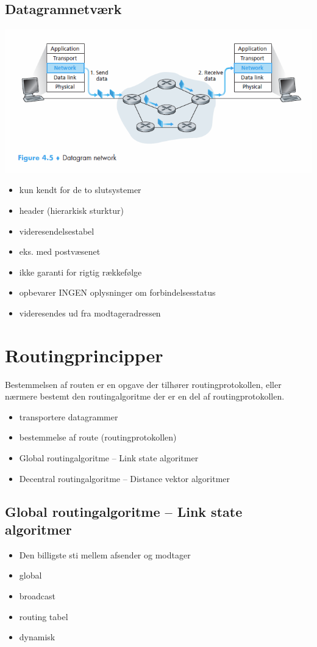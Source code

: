 {{\subsection{Datagramnetværk}
{\includegraphics{4-network-layer/datagramnetwork.png}
\begin{itemize}
	\item kun kendt for de to slutsystemer
	\item header (hierarkisk sturktur) 
	\item videresendelsestabel
	\item eks. med postvæsenet
	\item ikke garanti for rigtig rækkefølge
	\item opbevarer INGEN oplysninger om forbindelsesstatus
	\item videresendes ud fra modtageradressen
\end{itemize}

\section{Routingprincipper}
Bestemmelsen af routen er en opgave der tilhører routingprotokollen, eller nærmere bestemt den routingalgoritme der er en del af routingprotokollen.
\begin{itemize}
	\item transportere datagrammer
	\item bestemmelse af route (routingprotokollen)
	\item Global routingalgoritme – Link state algoritmer
	\item Decentral routingalgoritme – Distance vektor algoritmer
\end{itemize}

\subsection{Global routingalgoritme – Link state algoritmer}
\begin{itemize}
	\item Den billigste sti mellem afsender og modtager
	\item global
	\item broadcast
	\item routing tabel
	\item dynamisk
\end{itemize}

}}}
